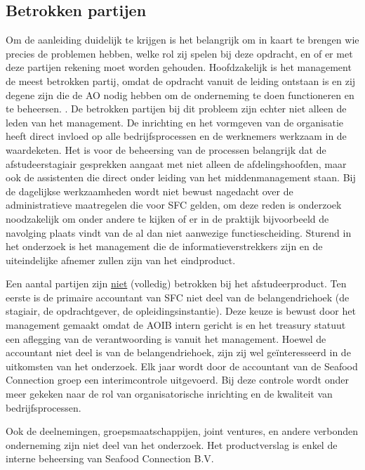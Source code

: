 \documentclass[10pt,a4paper,oneside]{report}
\begin{document}
\subsection{Betrokken partijen}
Om de aanleiding duidelijk te krijgen is het belangrijk om in kaart te brengen wie precies de problemen hebben, welke rol zij spelen bij deze opdracht, en of er met deze partijen rekening moet worden gehouden. Hoofdzakelijk is het management de meest betrokken partij, omdat de opdracht vanuit de leiding ontstaan is en zij degene zijn die de AO nodig hebben om de onderneming te doen functioneren en te beheersen. \citep{bivperspectief}. De betrokken partijen bij dit probleem zijn echter niet alleen de leden van het management. De inrichting en het vormgeven van de organisatie heeft direct invloed op alle bedrijfsprocessen en de werknemers werkzaam in de waardeketen. Het is voor de beheersing van de processen belangrijk dat de afstudeerstagiair gesprekken aangaat met niet alleen de afdelingshoofden, maar ook de assistenten die direct onder leiding van het middenmanagement staan. Bij de dagelijkse werkzaamheden wordt niet bewust nagedacht over de administratieve maatregelen die voor SFC gelden, om deze reden is onderzoek noodzakelijk om onder andere te kijken of er in de praktijk bijvoorbeeld de navolging plaats vindt van de al dan niet aanwezige functiescheiding. Sturend in het onderzoek is het management die de informatieverstrekkers zijn en de uiteindelijke afnemer zullen zijn van het eindproduct. 

Een aantal partijen zijn \underline{niet} (volledig) betrokken bij het afstudeerproduct. Ten eerste is de primaire accountant van SFC niet deel van de belangendriehoek (de stagiair, de opdrachtgever, de opleidingsinstantie). Deze keuze is bewust door het management gemaakt omdat de AOIB intern gericht is en het treasury statuut een aflegging van de verantwoording is vanuit het management. Hoewel de accountant niet deel is van de belangendriehoek, zijn zij wel geïnteresseerd in de uitkomsten van het onderzoek. Elk jaar wordt door de accountant van de Seafood Connection groep een interimcontrole uitgevoerd. Bij deze controle wordt onder meer gekeken naar de rol van organisatorische inrichting en de kwaliteit van bedrijfsprocessen. \citep{jaarrapport2017}

Ook de deelnemingen, groepsmaatschappijen, joint ventures, en andere verbonden onderneming zijn niet deel van het onderzoek. Het productverslag is enkel de interne beheersing van Seafood Connection B.V.
\end{document}
